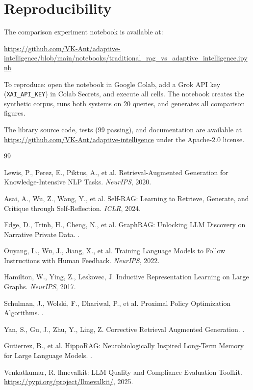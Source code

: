 \documentclass[11pt]{article}
\begin{document}
\section{Reproducibility}
\label{app:reproducibility}

The comparison experiment notebook is available at:

\begin{center}
\small
\url{https://github.com/VK-Ant/adaptive-intelligence/blob/main/notebooks/traditional_rag_vs_adaptive_intelligence.ipynb}
\end{center}

To reproduce: open the notebook in Google Colab, add a Grok API key (\texttt{XAI\_API\_KEY}) in Colab Secrets, and execute all cells. The notebook creates the synthetic corpus, runs both systems on 20 queries, and generates all comparison figures.

The library source code, tests (99 passing), and documentation are available at \url{https://github.com/VK-Ant/adaptive-intelligence} under the Apache-2.0 license.

\begin{thebibliography}{99}

Lewis, P., Perez, E., Piktus, A., et al.
\newblock Retrieval-Augmented Generation for Knowledge-Intensive NLP Tasks.
\newblock \textit{NeurIPS}, 2020.

Asai, A., Wu, Z., Wang, Y., et al.
\newblock Self-RAG: Learning to Retrieve, Generate, and Critique through Self-Reflection.
\newblock \textit{ICLR}, 2024.

Edge, D., Trinh, H., Cheng, N., et al.
\newblock GraphRAG: Unlocking LLM Discovery on Narrative Private Data.
.

Ouyang, L., Wu, J., Jiang, X., et al.
\newblock Training Language Models to Follow Instructions with Human Feedback.
\newblock \textit{NeurIPS}, 2022.

Hamilton, W., Ying, Z., Leskovec, J.
\newblock Inductive Representation Learning on Large Graphs.
\newblock \textit{NeurIPS}, 2017.

Schulman, J., Wolski, F., Dhariwal, P., et al.
\newblock Proximal Policy Optimization Algorithms.
.

Yan, S., Gu, J., Zhu, Y., Ling, Z.
\newblock Corrective Retrieval Augmented Generation.
.

Gutierrez, B., et al.
\newblock HippoRAG: Neurobiologically Inspired Long-Term Memory for Large Language Models.
.

Venkatkumar, R.
\newblock llmevalkit: LLM Quality and Compliance Evaluation Toolkit.
\newblock \url{https://pypi.org/project/llmevalkit/}, 2025.

\end{thebibliography}
\end{document}
